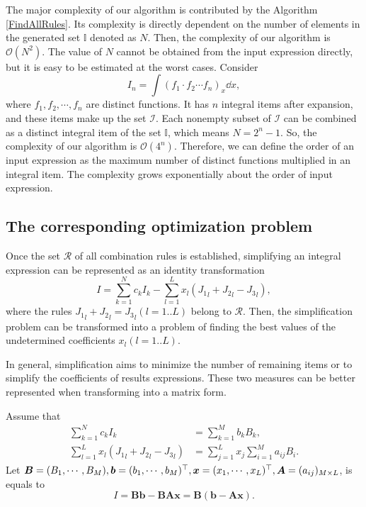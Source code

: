 The major complexity of our algorithm is contributed by the Algorithm \ref{FindAllRules}. Its complexity is directly dependent on the number of elements in the generated set $\mathbb I$ denoted as $N$. Then, the complexity of our algorithm is $\mathcal O(N^2)$. The value of $N$ cannot be obtained from the input expression directly, but it is easy to be estimated at the worst cases. Consider 
\begin{equation}
I_n=\int\!{(f_1\cdot f_2\cdots f_n)_x \dd x},
\label{worst_case}
\end{equation}
where $f_1,f_2,\cdots,f_n$ are distinct functions. It has $n$ integral items after expansion, and these items make up the set $\mathcal I$. Each nonempty subset of $\mathcal I$ can be combined as a distinct integral item of the set $\mathbb I$, which means $N=2^n-1$. So, the complexity of our algorithm is $\mathcal O(4^n)$. Therefore, we can define the order of an input expression as the maximum number of distinct functions multiplied in an integral item. The complexity grows exponentially about the order of input expression.

\subsection{The corresponding optimization problem}\label{optimization-03}

Once the set $\mathcal R$ of all combination rules is established, simplifying an integral expression can be represented as an identity transformation 
\begin{equation}
I=\sum_{k=1}^N{c_k I_k}-\sum_{l=1}^L{x_l ({J_1}_l+{J_2}_l-{J_3}_l)},
\label{normal_simplify}
\end{equation}
where the rules ${J_1}_l+{J_2}_l={J_3}_l(l=1..L)$ belong to $\mathcal R$. Then, the simplification problem can be transformed into a problem of finding the best values of the undetermined coefficients $x_l(l=1..L)$. 

In general, simplification aims to minimize the number of remaining items or to simplify the coefficients of results expressions. These two measures can be better represented when transforming   into a matrix form.

Assume that 
\begin{equation}
\begin{split}
\sum_{k=1}^N{c_k I_k} &= \sum_{k=1}^M{b_k B_k},\\
\sum_{l=1}^L{x_l ({J_1}_l+{J_2}_l-{J_3}_l)} &= \sum_{j=1}^L{x_j \sum_{i=1}^M{a_{ij} B_i}}.
\end{split}
\end{equation} 
Let $\bm B=(B_1,\cdots,B_M),\bm b=(b_1,\cdots,b_M)^\top,\bm x=(x_1,\cdots,x_L)^\top,\bm A=(a_{ij})_{M \times L}$,  is equals to 
\begin{equation}
I=\bm{B}\bm{b}-\bm{B}\bm{A}\bm{x}=\bm{B}(\bm{b}-\bm{A}\bm{x}).
\end{equation}

